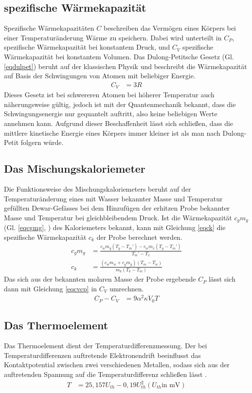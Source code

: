 \subsection{spezifische Wärmekapazität}
Spezifische Wärmekapazitäten $C$ beschreiben das Vermögen eines Körpers bei einer Temperaturänderung
Wärme zu speichern. Dabei wird unterteilt in $C_P$, spezifische Wärmekapazität bei konstantem Druck, und 
$C_V$ spezifische Wärmekapazität bei konstantem Volumen. Das Dulong-Petitsche Gesetz \cite{anleitung} 
(Gl. \ref{eqdulpet}) beruht auf der klassischen Physik und beschreibt die Wärmekapazität auf 
Basis der Schwingungen von Atomen mit beliebiger Energie.
\begin{align}
C_V&=3 R \label{eqdulpet}
\end{align}
Dieses Gesetz ist bei schwereren Atomen bei höherer Temperatur auch näherungsweise gültig, jedoch
ist mit der Quantenmechanik bekannt, dass die Schwingungsenergie nur gequantelt auftritt, also 
keine beliebigen Werte annehmen kann. Aufgrund dieser Beschaffenheit lässt sich schließen, dass
die mittlere kinetische Energie eines Körpers immer kleiner ist als man nach Dulong-Petit folgern 
würde.\\
\subsection{Das Mischungskaloriemeter}
Die Funktionsweise des Mischungskaloriemeters beruht auf der Temperaturänderung eines mit Wasser 
bekannter Masse und Temperatur gefüllten Dewar-Gefässes bei dem Hinzufügen der erhitzen Probe 
bekannter Masse und Temperatur bei gleichbleibendem Druck. Ist die Wärmekapazität $c_g m_g$ 
(Gl. \ref{eqcgmg},\cite{anleitung} ) des Kaloriemeters bekannt, kann mit Gleichung  \ref{eqck} 
die spezifische \cite{anleitung} Wärmekapazität $c_k$ der Probe berechnet werden. 
\begin{align}
c_gm_g&=\frac{c_w m_y (T_y - T_m')-c_w m_x(T_y-T_m')}{T_m'-T_x} \label{eqcgmg} \\
c_k&=\frac{(c_w m_w + c_g m_g)(T_m-T_w)}{m_k(T_k - T_m)} \label{eqck}
\end{align}
Das sich aus der bekannten molaren Masse der Probe ergebende $C_P$ lässt sich dann mit
Gleichung  \ref{eqcvcp} \cite{anleitung}  in $C_V$ umrechnen.
\begin{align}
C_P-C_V&=9 \alpha^2 \kappa V_0 T \label{eqcvcp}
\end{align}
\subsection{Das Thermoelement}
Das Thermoelement dient der Temperaturdifferenzmessung. Der bei Temperaturdifferenzen auftretende
Elektronendrift beeinflusst das Kontaktpotential zwischen zwei verschiedenen Metallen, sodass sich 
aus der auftretenden Spannung auf die Temperaturdifferenz schließen lässt \cite{anleitung}.
\begin{align}
T&=25,157 U_{th} - 0,19 U_{th}^2 (U_{th} \text{in mV}) \label{eqt}
\end{align}
